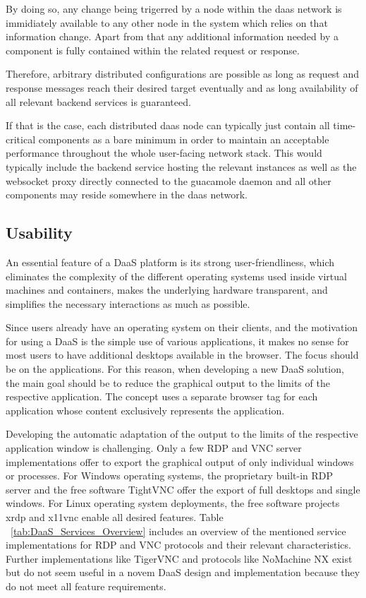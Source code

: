 \documentclass[runningheads]{llncs}
\begin{document}
By doing so, any change being trigerred by a node within the daas network
is immidiately available to any other node in the system
which relies on that information change.
Apart from that any additional information needed by a component
is fully contained within the related request or response.

Therefore, arbitrary distributed configurations are possible
as long as request and response messages reach their desired target eventually
and as long availability of all relevant backend services is guaranteed.

If that is the case, each distributed daas node can typically
just contain all time-critical components as a bare minimum
in order to maintain an acceptable performance throughout the whole user-facing network stack.
This would typically include the backend service hosting the relevant instances
as well as the websocket proxy directly connected to the guacamole daemon
and all other components may reside somewhere in the daas network.


\subsection{Usability}


An essential feature of a DaaS platform is its strong user-friendliness, which eliminates the complexity of the different operating systems used inside virtual machines and containers, makes the underlying hardware transparent, and simplifies the necessary interactions as much as possible.

Since users already have an operating system on their clients, and the motivation for using a DaaS is the simple use of various applications, it makes no sense for most users to have additional desktops available in the browser. The focus should be on the applications. For this reason, when developing a new DaaS solution, the main goal should be to reduce the graphical output to the limits of the respective application. The concept uses a separate browser tag for each application whose content exclusively represents the application.

Developing the automatic adaptation of the output to the limits of the respective application window is challenging. Only a few RDP and VNC server implementations offer to export the graphical output of only individual windows or processes. For Windows operating systems, the proprietary built-in RDP server and the free software TightVNC offer the export of full desktops and single windows. For Linux operating system deployments, the free software projects xrdp and x11vnc enable all desired features. Table ~\ref{tab:DaaS_Services_Overview} includes an overview of the mentioned service implementations for RDP and VNC protocols and their relevant characteristics. Further implementations like TigerVNC and protocols like NoMachine NX exist but do not seem useful in a novem DaaS design and implementation because they do not meet all feature requirements.~\cite{OJCC_2023v8i1n01_Baun}
\end{document}
